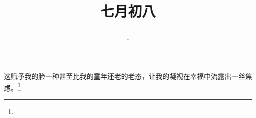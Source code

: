 \title{\date[d=11,m=8,y=2024][year:cn-y,年,month:cn,day:cn,日,·,weekday]·七月初八 }
这赋予我的脸一种甚至比我的童年还老的老态，让我的凝视在幸福中流露出一丝焦虑。\footnote{ }

